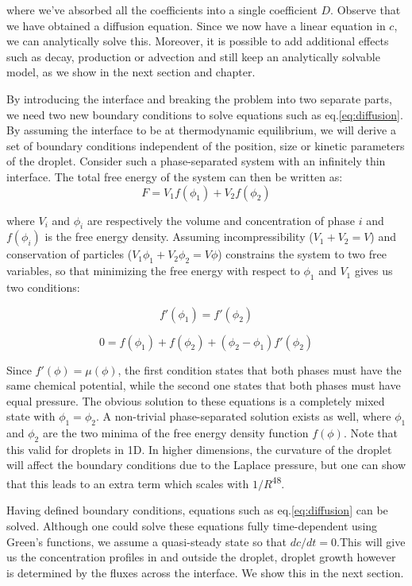 \documentclass{Dissertate}
\begin{document}
where we've absorbed all the coefficients into a single coefficient
\(D\). Observe that we have obtained a diffusion equation. Since we now
have a linear equation in \(c\), we can analytically solve this.
Moreover, it is possible to add additional effects such as decay,
production or advection and still keep an analytically solvable model,
as we show in the next section and chapter.

By introducing the interface and breaking the problem into two separate
parts, we need two new boundary conditions to solve equations such as
eq.\ref{eq:diffusion}. By assuming the interface to be at thermodynamic
equilibrium, we will derive a set of boundary conditions independent of
the position, size or kinetic parameters of the droplet. Consider such a
phase-separated system with an infinitely thin interface. The total free
energy of the system can then be written as: \[
F = V_1 f(\phi_1) + V_2 f(\phi_2)
\]

where \(V_i\) and \(\phi_i\) are respectively the volume and
concentration of phase \(i\) and \(f(\phi_i)\) is the free energy
density. Assuming incompressibility (\(V_1+V_2=V\)) and conservation of
particles (\(V_1\phi_1+V_2\phi_2=V\phi\)) constrains the system to two
free variables, so that minimizing the free energy with respect to
\(\phi_1\) and \(V_1\) gives us two conditions:

\[
f'(\phi_1) = f'(\phi_2)
\]

\[
0 = f(\phi_1) + f(\phi_2) + (\phi_2-\phi_1)f'(\phi_2)
\]

Since \(f'(\phi) = \mu(\phi)\), the first condition states that both
phases must have the same chemical potential, while the second one
states that both phases must have equal pressure. The obvious solution
to these equations is a completely mixed state with \(\phi_1=\phi_2\). A
non-trivial phase-separated solution exists as well, where \(\phi_1\)
and \(\phi_2\) are the two minima of the free energy density function
\(f(\phi)\). Note that this valid for droplets in 1D. In higher
dimensions, the curvature of the droplet will affect the boundary
conditions due to the Laplace pressure, but one can show that this leads
to an extra term which scales with \(1/R\)\textsuperscript{48}.

Having defined boundary conditions, equations such as
eq.\ref{eq:diffusion} can be solved. Although one could solve these
equations fully time-dependent using Green's functions, we assume a
quasi-steady state so that \(dc/dt=0\).This will give us the
concentration profiles in and outside the droplet, droplet growth
however is determined by the fluxes across the interface. We show this
in the next section.
\end{document}

